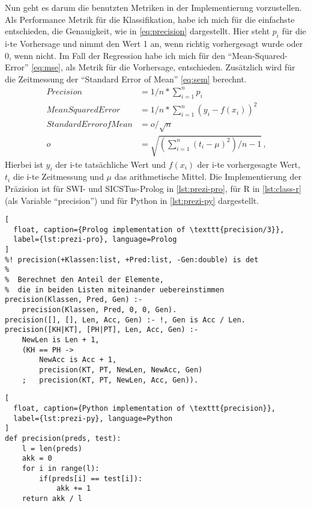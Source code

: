 Nun geht es darum die benutzten Metriken in der Implementierung vorzustellen.
Als Performance Metrik für die Klassifikation, habe ich mich für die einfachste entschieden,
die Genauigkeit, wie in \cref{eq:precision} dargestellt. Hier steht \(p_i\) für die i-te Vorhersage und nimmt den Wert 1 an,
wenn richtig vorhergesagt wurde oder 0, wenn nicht.
Im Fall der Regression habe ich mich für den \enquote{Mean-Squared-Error} \cref{eq:mse},
als Metrik für die Vorhersage, entschieden.
Zusätzlich wird für die Zeitmessung der \enquote{Standard Error of Mean} \cref{eq:sem} berechnt.
\begin{align}
  Precision               & =  1/n * \sum_{i=1}^n p_i  \label{eq:precision} \\
  Mean Squared Error       & = 1/n * \sum_{i=1}^n (y_i - f(x_i))^2 \label{eq:mse} \\
  Standard Error of Mean       & = o/\sqrt{n} \label{eq:sem} \\
  o                        & = \sqrt{(\sum_{i=1}^n (t_i - \mu)^2)/n-1 } 
  \,\text{,}
\end{align}
Hierbei ist \(y_i\) der i-te tatsächliche Wert und \(f(x_i)\) der i-te vorhergesagte Wert, \(t_i\) die i-te Zeitmessung und \(\mu\) das arithmetische Mittel.
Die Implementierung der Präzision ist für SWI- und SICSTus-Prolog in \cref{lst:prezi-pro}, für R in \cref{lst:class-r} (als Variable \enquote{precision})
und für Python in \cref{lst:prezi-py} dargestellt.
\begin{lstlisting}[
  float, caption={Prolog implementation of \texttt{precision/3}},
  label={lst:prezi-pro}, language=Prolog
]
%! precision(+Klassen:list, +Pred:list, -Gen:double) is det
%
%  Berechnet den Anteil der Elemente,
%  die in beiden Listen miteinander uebereinstimmen
precision(Klassen, Pred, Gen) :-
    precision(Klassen, Pred, 0, 0, Gen).
precision([], [], Len, Acc, Gen) :- !, Gen is Acc / Len.
precision([KH|KT], [PH|PT], Len, Acc, Gen) :-
    NewLen is Len + 1,
    (KH == PH ->
        NewAcc is Acc + 1,
        precision(KT, PT, NewLen, NewAcc, Gen)
    ;   precision(KT, PT, NewLen, Acc, Gen)).
\end{lstlisting}

\begin{lstlisting}[
  float, caption={Python implementation of \texttt{precision}},
  label={lst:prezi-py}, language=Python
]
def precision(preds, test):
    l = len(preds)
    akk = 0
    for i in range(l):
        if(preds[i] == test[i]):
            akk += 1
    return akk / l
\end{lstlisting}

